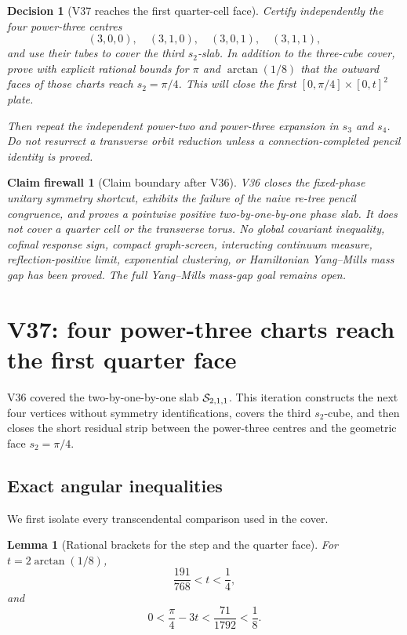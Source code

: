 \documentclass[11pt,oneside]{article}
\newtheorem{lemma}[theorem]{Lemma}
\newtheorem{firewall}[theorem]{Claim firewall}
\newtheorem{decision}[theorem]{Decision}
\theoremstyle{definition}
\theoremstyle{remark}
\begin{document}
\begin{decision}[V37 reaches the first quarter-cell face]
\label{dec:newv36-next}
Certify independently the four power-three centres
\[
 (3,0,0),\quad(3,1,0),\quad(3,0,1),\quad(3,1,1),       \tag{36.30}
\]
and use their tubes to cover the third \(s_2\)-slab.  In addition to
the three-cube cover, prove with explicit rational bounds for
\(\pi\) and \(\arctan(1/8)\) that the outward faces of those charts
reach \(s_2=\pi/4\).  This will close the first
\([0,\pi/4]\times[0,t]^2\) plate.

Then repeat the independent power-two and power-three expansion in
\(s_3\) and \(s_4\).  Do not resurrect a transverse orbit reduction
unless a connection-completed pencil identity is proved.
\end{decision}

\begin{firewall}[Claim boundary after V36]
\label{fire:newv36-final}
V36 closes the fixed-phase unitary symmetry shortcut, exhibits the
failure of the naive re-tree pencil congruence, and proves a
pointwise positive two-by-one-by-one phase slab.  It does not cover
a quarter cell or the transverse torus.  No global covariant
inequality, cofinal response sign, compact graph-screen, interacting
continuum measure, reflection-positive limit, exponential
clustering, or Hamiltonian Yang--Mills mass gap has been proved.
The full Yang--Mills mass-gap goal remains open.
\end{firewall}

\section{V37: four power-three charts reach the first quarter face}
\label{sec:newv37-first-face}

V36 covered the two-by-one-by-one slab
\({\cal S}_{2,1,1}\).  This iteration constructs the next four
vertices without symmetry identifications, covers the third
\(s_2\)-cube, and then closes the short residual strip between the
power-three centres and the geometric face \(s_2=\pi/4\).

\subsection{Exact angular inequalities}

We first isolate every transcendental comparison used in the cover.

\begin{lemma}[Rational brackets for the step and the quarter face]
\label{lem:newv37-angle}
For \(t=2\arctan(1/8)\),
\[
 \frac{191}{768}<t<\frac14,                            \tag{37.1}
\]
and
\[
 0<\frac{\pi}{4}-3t
 <\frac{71}{1792}<\frac18.                            \tag{37.2}
\]
\end{lemma}
\end{document}
